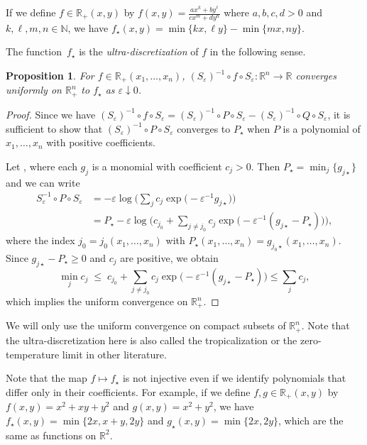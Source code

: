 \documentclass[pdftex]{sigma}
\numberwithin{equation}{section}
\newtheorem{Proposition}[Theorem]{Proposition}
 { \theoremstyle{definition}
\newtheorem{Definition}[Theorem]{Definition}
\newtheorem{Note}[Theorem]{Note}
\newtheorem{Example}[Theorem]{Example}
\newtheorem{Remark}[Theorem]{Remark} }
\def\R{\mathbb{R}}
\def\e{\varepsilon}
\begin{document}
\begin{Example}
If we define $f\in\R_+(x,y)$ by $f(x,y)=\frac{ax^k+by^{\ell}}{cx^m+dy^{n}}$ where $a,b,c,d >0$ and ${k,\ell,m,n \in \mathbb N}$, we have
$f_{\star}(x,y)=\min\{kx,\ell y\} - \min \{mx, ny\}$.
\end{Example}

The function~$f_{\star}$ is the {\it ultra-discretization} of $f$ in the following sense.

\begin{Proposition}\label{prop:zero-temp limit}
For $f\in\R_+(x_1,\ldots,x_n)$,
$(S_{\e})^{-1}\circ f\circ S_{\e}\colon \R^n\to\R$ converges
uniformly on $\R_+^n$
to $f_{\star}$ as $\e\downarrow0$.
\end{Proposition}
\begin{proof}
Since we have $(S_{\e})^{-1}\circ f\circ S_{\e}
=(S_{\e})^{-1}\circ P\circ S_{\e}-(S_{\e})^{-1}\circ Q\circ S_{\e}$,
it is sufficient to show that
$(S_{\e})^{-1}\circ P\circ S_{\e}$ converges to $P_{\star}$ when
$P$ is a polynomial of $x_1,\ldots,x_n$ with positive coefficients.

Let , where each $g_j$ is a monomial with coefficient $c_j>0$.
Then $P_\star=\min_j\{g_{j\star}\}$ and we can write
\begin{align*}
S^{-1}_\varepsilon \circ P \circ S_\varepsilon
&{}= -\varepsilon \log \biggl( \sum_j c_j \exp\bigl(-\varepsilon^{-1} g_{j\star}\bigr) \biggr)\\
&{}= P_\star - \varepsilon \log \biggl( c_{j_0} + \sum_{j\neq j_0} c_j \exp\bigl(-\varepsilon^{-1}(g_{j\star}-P_\star)\bigr) \biggr),
\end{align*}
where the index $j_0=j_0(x_1,\ldots,x_n)$ with $P_\star(x_1,\ldots,x_n)=g_{j_0\star}(x_1,\ldots,x_n)$.
Since $g_{j\star}-P_\star\geq 0$ and $c_j$ are positive, we obtain
\[
\min_j c_j \;\le\; c_{j_0}+\sum_{j\neq j_0} c_j \exp\bigl(-\varepsilon^{-1}(g_{j\star}-P_\star)\bigr) \le \sum_j c_j,
\]
which implies the uniform convergence on %
$\mathbb{R}_+^n$.
\end{proof}

We will only use the uniform convergence on compact subsets of $\R_+^n$.
Note that the ultra-discretization here is also called the tropicalization or the zero-temperature limit in other literature.

\begin{Remark}
Note that the map $f\mapsto f_{\star}$ is not injective even if we identify polynomials that differ only in their coefficients.
For example, if we define $f,g\in\R_+(x,y)$ by
$f(x,y)=x^2+xy+y^2$ and $g(x,y)=x^2+y^2$, we have
$f_{\star}(x,y)=\min\{2x,x+y,2y\}$ and
$g_{\star}(x,y)=\min\{2x,2y\}$, which are the same as
functions on $\R^2$.
\end{Remark}
\end{document}
